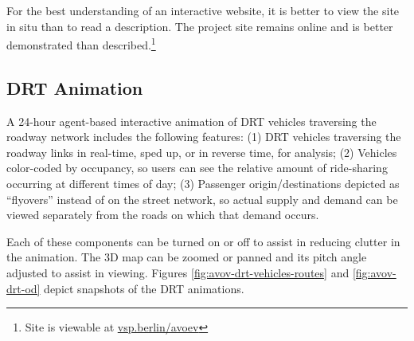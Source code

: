 For the best understanding of an interactive website, it is better to view the site in situ than to read a description. The project site remains online and is better demonstrated than described.\footnote{Site is viewable at \href{https://vsp.berlin/avoev/}{vsp.berlin/avoev}}

\subsection{DRT Animation}

A 24-hour agent-based interactive animation of DRT vehicles traversing the roadway network includes the following features: (1) DRT vehicles traversing the roadway links in real-time, sped up, or in reverse time, for analysis; (2) Vehicles color-coded by occupancy, so users can see the relative amount of ride-sharing occurring at different times of day; (3) Passenger origin/destinations depicted as ``flyovers'' instead of on the street network, so actual supply and demand can be viewed separately from the roads on which that demand occurs.

Each of these components can be turned on or off to assist in reducing clutter in the animation. The 3D map can be zoomed or panned and its pitch angle adjusted to assist in viewing. Figures \ref{fig:avov-drt-vehicles-routes} and \ref{fig:avov-drt-od} depict snapshots of the DRT animations.

